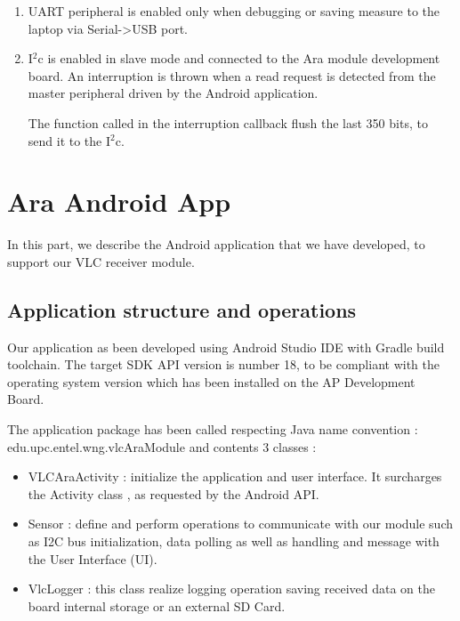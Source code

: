 \begin{enumerate}
\item UART peripheral is enabled only when debugging or saving measure to the laptop via Serial->USB port.

\item I$^2$c is enabled in slave mode and connected to the Ara module development board. An interruption is thrown when a read request is detected from the master peripheral driven by the Android application.

The function called in the interruption callback flush the last 350 bits, to send it to the I$^2$c.


\end{enumerate}


\section{Ara Android App}

In this part, we describe the Android application that we have developed, to support our VLC receiver module.

\subsection{Application structure and operations}
Our application as been developed using Android Studio IDE with Gradle build toolchain. The target SDK API version is number 18, to be compliant with the operating system version which has been installed on the AP Development Board.

The application package has been called respecting Java name convention : edu.upc.entel.wng.vlcAraModule and contents 3 classes :

\begin{itemize}
\item VLCAraActivity : initialize the application and user interface. It surcharges the Activity class , as requested by the Android API.
\item Sensor : define and perform operations to communicate with our module such as I2C bus initialization, data polling as well as handling and message with the User Interface (UI).
\item VlcLogger : this class realize logging operation saving received data on the board internal storage or an external SD Card.
\end{itemize}

